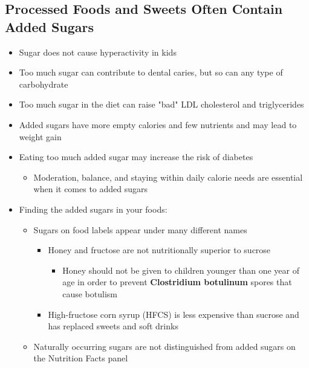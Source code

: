 \documentclass[12pt]{article}
\begin{document}
        \subsection{Processed Foods and Sweets Often Contain Added Sugars}
            \begin{itemize}
                \item Sugar does not cause hyperactivity in kids
                \item Too much sugar can contribute to dental caries, but so can any type of carbohydrate
                \item Too much sugar in the diet can raise "bad" LDL cholesterol and triglycerides
                \item Added sugars have more empty calories and few nutrients and may lead to weight gain
                \item Eating too much added sugar may increase the risk of diabetes
                    \begin{itemize}
                        \item Moderation, balance, and staying within daily calorie needs are essential when it comes to added sugars
                    \end{itemize}
                \item Finding the added sugars in your foods:
                    \begin{itemize}
                        \item Sugars on food labels appear under many different names
                            \begin{itemize}
                                \item Honey and fructose are not nutritionally superior to sucrose
                                    \begin{itemize}
                                        \item Honey should not be given to children younger than one year of age in order to prevent \textbf{Clostridium botulinum} spores that cause botulism
                                    \end{itemize}
                                \item High-fructose corn syrup (HFCS) is less expensive than sucrose and has replaced sweets and soft drinks
                            \end{itemize}
                        \item Naturally occurring sugars are not distinguished from added sugars on the Nutrition Facts panel
                    \end{itemize}
            \end{itemize}
        
\end{document}
